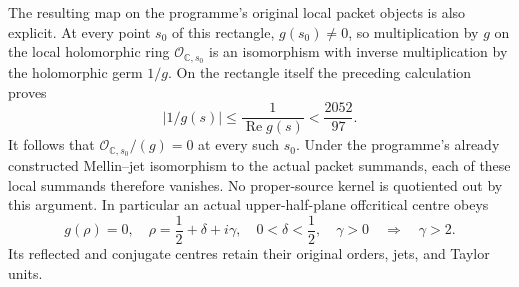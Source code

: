 The resulting map on the programme's original local packet objects
is also explicit.  At every point $s_0$ of this rectangle,
$g(s_0)\ne0$, so multiplication by $g$ on the local holomorphic
ring $\mathcal O_{\mathbb{C},s_0}$ is an isomorphism with inverse
multiplication by the holomorphic germ $1/g$.  On the rectangle
itself the preceding calculation proves
\[
 |1/g(s)|\leq\frac1{\operatorname{Re}g(s)}
                  <\frac{2052}{97}.
\tag{LHT.17}
\]
It follows that
$\mathcal O_{\mathbb{C},s_0}/(g)=0$ at every such $s_0$.
Under the programme's already constructed Mellin--jet isomorphism
to the actual packet summands, each of these local summands therefore
vanishes.  No proper-source kernel is quotiented out by
this argument.  In particular an actual upper-half-plane offcritical
centre obeys
\[
 g(\rho)=0,\quad
 \rho=\frac12+\delta+i\gamma,\quad
 0<\delta<\frac12,\quad \gamma>0
 \quad\Longrightarrow\quad \gamma>2.
\tag{LHT.18}
\]
Its reflected and conjugate centres retain their original orders,
jets, and Taylor units.
